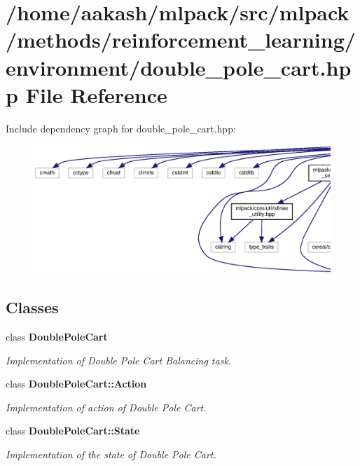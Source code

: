 \section{/home/aakash/mlpack/src/mlpack/methods/reinforcement\+\_\+learning/environment/double\+\_\+pole\+\_\+cart.hpp File Reference}
\label{double__pole__cart_8hpp}
Include dependency graph for double\+\_\+pole\+\_\+cart.\+hpp\+:
\nopagebreak
\begin{figure}[H]
\begin{center}
\leavevmode
\includegraphics[width=350pt]{double__pole__cart_8hpp__incl}
\end{center}
\end{figure}
\subsection*{Classes}
\begin{DoxyCompactItemize}
\item 
class \textbf{ Double\+Pole\+Cart}
\begin{DoxyCompactList}\small\item\em Implementation of Double Pole Cart Balancing task. \end{DoxyCompactList}\item 
class \textbf{ Double\+Pole\+Cart\+::\+Action}
\begin{DoxyCompactList}\small\item\em Implementation of action of Double Pole Cart. \end{DoxyCompactList}\item 
class \textbf{ Double\+Pole\+Cart\+::\+State}
\begin{DoxyCompactList}\small\item\em Implementation of the state of Double Pole Cart. \end{DoxyCompactList}\end{DoxyCompactItemize}
